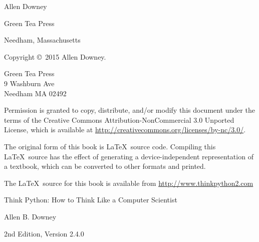 \documentclass[10pt]{book}
\newcommand{\thetitle}{Think Python: How to Think Like a Computer Scientist}
\newcommand{\theversion}{2nd Edition, Version 2.4.0}
\newcommand{\thedate}{}
\begin{document}
\begin{latexonly}
\begin{flushright}
{\Large
Allen Downey\\
}


\vspace{0.5in}

{\Large Green Tea Press}

{\small Needham, Massachusetts}

\vfill

\end{flushright}


\pagebreak
\thispagestyle{empty}

{\small
Copyright \copyright ~2015 Allen Downey.


\vspace{0.2in}

\begin{flushleft}
Green Tea Press       \\
9 Washburn Ave        \\
Needham MA 02492
\end{flushleft}

Permission is granted to copy, distribute, and/or modify this document
under the terms of the Creative Commons Attribution-NonCommercial 3.0 Unported
License, which is available at \url{http://creativecommons.org/licenses/by-nc/3.0/}.

The original form of this book is \LaTeX\ source code. Compiling this
\LaTeX\ source has the effect of generating a device-independent
representation of a textbook, which can be converted to other formats
and printed.

The \LaTeX\ source for this book is available from
\url{http://www.thinkpython2.com}

\vspace{0.2in}

} %

\end{latexonly}



\begin{htmlonly}


{\Large \thetitle}

{\large Allen B. Downey}

\theversion

\thedate

\setcounter{chapter}{-1}

\end{htmlonly}
\end{document}

